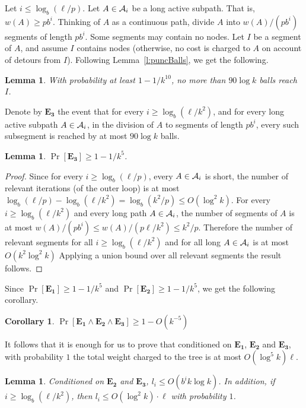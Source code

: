 \documentclass[twoside,leqno,twocolumn]{article}
\newtheorem{lemma}[theorem]{Lemma}
\newtheorem{corollary}[theorem]{Corollary}
\begin{document}
Let $i \le \log_b(\ell/p)$.
Let $A \in {\cal A}_i$ be a long active subpath. That is, $w(A) \ge pb^i$.
Thinking of $A$ as a continuous path, divide $A$ into $w(A) / (pb^i)$ segments of length $pb^i$. Some segments may contain no nodes.
Let $I$ be a segment of $A$, and assume $I$ contains nodes (otherwise, no cost is charged to $A$ on account of detours from $I$). Following Lemma~\ref{l:puncBalls}, we get the following.
\begin{lemma}
With probability at least $1-1/k^{10}$, no more than $90 \log k$ balls reach $I$.
\end{lemma}
Denote by $\mathbf{E_3}$ the event that for every $i \ge \log_b(\ell/k^2)$, and for every long active subpath $A \in {\cal A}_i$, in the division of $A$ to segments of length $pb^i$, every such subsegment is reached by at most $90 \log k$ balls.
\begin{lemma}
$\Pr[ \mathbf{E_3}] \ge 1-1/k^5$.
\end{lemma}
\begin{proof}
Since for every $i \ge \log_b(\ell/p)$, every $A \in {\cal A}_i$ is short, the number of relevant iterations (of the outer loop) is at most $\log_b(\ell/p) - \log_b(\ell/k^2) = \log_b(k^2/p) \le O(\log^2k)$.
For every $i \ge \log_b(\ell/k^2)$ and every long path $A \in {\cal A}_i$, the number of segments of $A$ is at most 
$w(A) / (pb^i) \le w(A) / (p \ell / k^2) \le k^2/p$.
Therefore the number of relevant segments for all $i \ge \log_b(\ell/k^2)$ and for all long $A \in {\cal A}_i$ is at most $O(k^2\log^2k)$
Applying a union bound over all relevant segments the result follows.
\end{proof}
Since $\Pr[\mathbf{E_1}] \ge 1-1/k^5$ and $\Pr[\mathbf{E_2}] \ge 1-1/k^5$, we get the following corollary.
\begin{corollary}
$\Pr[\mathbf{E_1} \wedge \mathbf{E_2} \wedge \mathbf{E_3}] \ge 1-O(k^{-5})$
\end{corollary}
It follows that it is enough for us to prove that conditioned on $\mathbf{E_1}$, $\mathbf{E_2}$ and $\mathbf{E_3}$, with probability $1$ the total weight charged to the tree is at most $O(\log^5k)\ell$.
\begin{lemma} \label{l:long}
Conditioned on $\mathbf{E_2}$ and $\mathbf{E_3}$, $l_i \le O( b^{i} k \log k )$. In addition, if $i \ge \log_b(\ell/k^2)$, 
then $l_i \le O(\log ^2 k) \cdot \ell$ with probability $1$.
\end{lemma}
\end{document}
